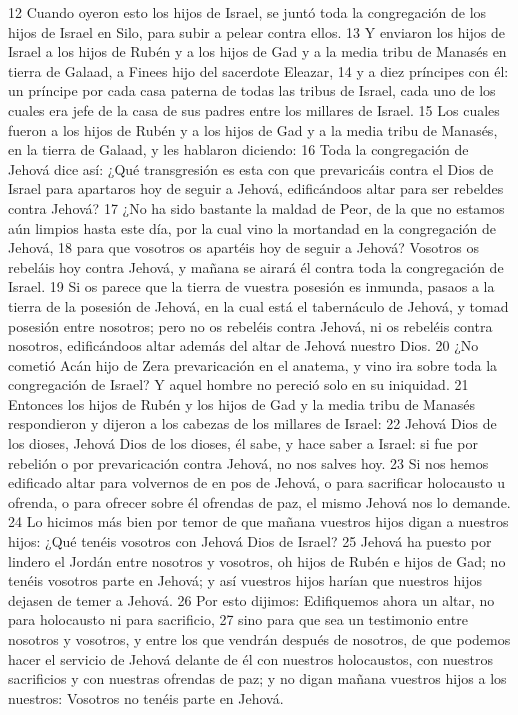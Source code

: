 12 Cuando oyeron esto los hijos de Israel, se juntó toda la congregación de los hijos de Israel en Silo, para subir a pelear contra ellos.
13 Y enviaron los hijos de Israel a los hijos de Rubén y a los hijos de Gad y a la media tribu de Manasés en tierra de Galaad, a Finees hijo del sacerdote Eleazar,
14 y a diez príncipes con él: un príncipe por cada casa paterna de todas las tribus de Israel, cada uno de los cuales era jefe de la casa de sus padres entre los millares de Israel.
15 Los cuales fueron a los hijos de Rubén y a los hijos de Gad y a la media tribu de Manasés, en la tierra de Galaad, y les hablaron diciendo:
16 Toda la congregación de Jehová dice así: ¿Qué transgresión es esta con que prevaricáis contra el Dios de Israel para apartaros hoy de seguir a Jehová, edificándoos altar para ser rebeldes contra Jehová? 
17 ¿No ha sido bastante la maldad de Peor, de la que no estamos aún limpios hasta este día, por la cual vino la mortandad en la congregación de Jehová, 
18 para que vosotros os apartéis hoy de seguir a Jehová? Vosotros os rebeláis hoy contra Jehová, y mañana se airará él contra toda la congregación de Israel.
19 Si os parece que la tierra de vuestra posesión es inmunda, pasaos a la tierra de la posesión de Jehová, en la cual está el tabernáculo de Jehová, y tomad posesión entre nosotros; pero no os rebeléis contra Jehová, ni os rebeléis contra nosotros, edificándoos altar además del altar de Jehová nuestro Dios.
20 ¿No cometió Acán hijo de Zera prevaricación en el anatema, y vino ira sobre toda la congregación de Israel? Y aquel hombre no pereció solo en su iniquidad. 
21 Entonces los hijos de Rubén y los hijos de Gad y la media tribu de Manasés respondieron y dijeron a los cabezas de los millares de Israel:
22 Jehová Dios de los dioses, Jehová Dios de los dioses, él sabe, y hace saber a Israel: si fue por rebelión o por prevaricación contra Jehová, no nos salves hoy.
23 Si nos hemos edificado altar para volvernos de en pos de Jehová, o para sacrificar holocausto u ofrenda, o para ofrecer sobre él ofrendas de paz, el mismo Jehová nos lo demande.
24 Lo hicimos más bien por temor de que mañana vuestros hijos digan a nuestros hijos: ¿Qué tenéis vosotros con Jehová Dios de Israel?
25 Jehová ha puesto por lindero el Jordán entre nosotros y vosotros, oh hijos de Rubén e hijos de Gad; no tenéis vosotros parte en Jehová; y así vuestros hijos harían que nuestros hijos dejasen de temer a Jehová.
26 Por esto dijimos: Edifiquemos ahora un altar, no para holocausto ni para sacrificio,
27 sino para que sea un testimonio entre nosotros y vosotros, y entre los que vendrán después de nosotros, de que podemos hacer el servicio de Jehová delante de él con nuestros holocaustos, con nuestros sacrificios y con nuestras ofrendas de paz; y no digan mañana vuestros hijos a los nuestros: Vosotros no tenéis parte en Jehová.
